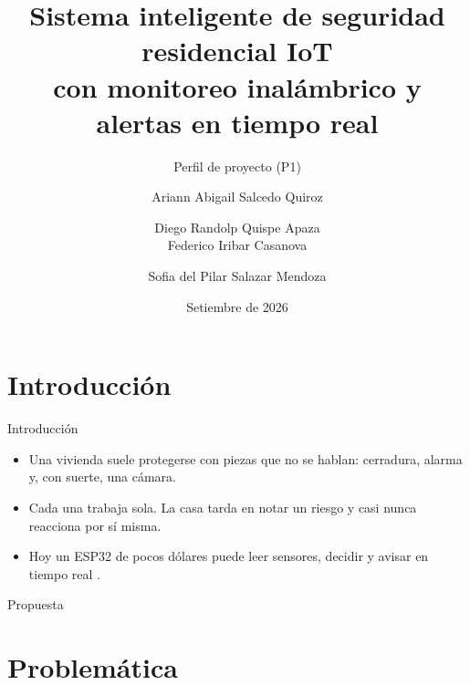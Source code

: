 \documentclass[aspectratio=169,10pt]{beamer}
\title[Seguridad residencial IoT]{Sistema inteligente de seguridad residencial IoT\\
  con monitoreo inalámbrico y alertas en tiempo real}
\subtitle{Perfil de proyecto (P1)}
\author[Salcedo, Quispe, Iribar, Salazar]{Ariann Abigail Salcedo Quiroz \and
  Diego Randolp Quispe Apaza \\ Federico Iribar Casanova \and
  Sofia del Pilar Salazar Mendoza}
\institute[UTEC]{Internet de las Cosas\\Universidad de Ingeniería y Tecnología}
\date[Set. 2026]{Setiembre de 2026}
\begin{document}
\begin{frame}
  \titlepage
\end{frame}

\section{Introducción}

\begin{frame}{Introducción}
  \begin{itemize}
    \item Una vivienda suele protegerse con piezas que no se hablan: cerradura, alarma y, con suerte, una cámara.
    \item Cada una trabaja sola. La casa tarda en notar un riesgo y casi nunca reacciona por sí misma.
    \item Hoy un ESP32 de pocos dólares puede leer sensores, decidir y avisar en tiempo real \cite{alfuqaha2015survey, oktafiani2025esp32}.
  \end{itemize}
  \vspace{4mm}
  \begin{block}{Propuesta}
    \centering
  \end{block}
\end{frame}

\section{Problemática}
\end{document}
